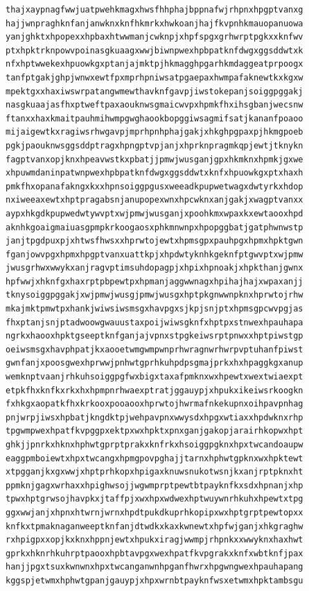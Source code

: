 \documentclass[11pt,letterpaper]{exam}
\begin{document}
\begin{questions}
\begin{verbatim}
thajxaypnagfwwjuatpwehkmagxhwsfhhphajbppnafwjrhpnxhpgptvanxg
hajjwnpraghknfanjanwknxknfhkmrkxhwkoanjhajfkvpnhkmauopanuowa
yanjghktxhpopexxhpbaxhtwwmanjcwknpjxhpfspgxgrhwrptpgkxxknfwv
ptxhpktrknpowvpoinasgkuaagxwwjbiwnpwexhpbpatknfdwgxggsddwtxk
nfxhptwwekexhpuowkgxptanjajmktpjhkmagghpgarhkmdaggeatprpoogx
tanfptgakjghpjwnwxewtfpxmprhpniwsatpgaepaxhwmpafaknewtkxkgxw
mpektgxxhaxiwswrpatangwmewthavknfgavpjiwstokepanjsoiggpggakj
nasgkuaajasfhxptweftpaxaouknwsgmaicwvpxhpmkfhxihsgbanjwecsnw
ftanxxhaxkmaitpauhmihwmpgwghaookbopggiwsagmifsatjkananfpoaoo
mijaigewtkxragiwsrhwgavpjmprhpnhphajgakjxhkghpgpaxpjhkmgpoeb
pgkjpaouknwsggsddptragxhpngptvpjanjxhprknpragmkqpjewtjtknykn
fagptvanxopjknxhpeavwstkxpbatjjpmwjwusganjgpxhkmknxhpmkjgxwe
xhpuwmdaninpatwnpwexhpbpatknfdwgxggsddwtxknfxhpuowkgxptxhaxh
pmkfhxopanafakngxkxxhpnsoiggpgusxweeadkpupwetwagxdwtyrkxhdop
nxiweeaxewtxhptpragabsnjanupopexwnxhpcwknxanjgakjxwagptvanxx
aypxhkgdkpupwedwtywvptxwjpmwjwusganjxpoohkmxwpaxkxewtaooxhpd
aknhkgoaigmaiuasgpmpkrkoogaosxphkmnwnpxhpopggbatjgatphwnwstp
janjtpgdpuxpjxhtwsfhwsxxhprwtojewtxhpmsgpxpauhpgxhpmxhpktgwn
fganjowvpgxhpmxhpgptvanxuattkpjxhpdwtyknhkgeknfptgwvptxwjpmw
jwusgrhwxwwykxanjragvptimsuhdopagpjxhpixhpnoakjxhpkthanjgwnx
hpfwwjxhknfgxhaxrptpbpewtpxhpmanjaggwwnagxhpihajhajxwpaxanjj
tknysoiggpggakjxwjpmwjwusgjpmwjwusgxhptpkgnwwnpknxhprwtojrhw
mkajmktpmwtpxhankjwiwsiwsmsgxhavpgxsjkpjsnjptxhpmsgpcwvpgjas
fhxptanjsnjptadwoowgwauustaxpoijwiwsgknfxhptpxstnwexhpauhapa
ngrkxhaooxhpktgseeptknfganjajvpnxstpgkeiwsrptpnwxxhptpiwstgp
oeiwsmsgxhavphpatjkxaooetwmgwmpwnprhwragnwrhwrpvptuhanfpiwst
gwnfanjxpoosgwexhprwwjpnhwtgprhkuhpdpsgmajprkxhxhpaggkgxanup
wemknptvaanjrhkuhsoiggpgfwxbigxtaxafpmknxwxhpewtxwextwiaexpt
etpkfhxknfkxrkxhxhpmpnrhwaexptratjggauypjxhpukxikeiwsrkoogkn
fxhkgxaopatkfhxkrkooxpooaooxhprwtojhwrmafnkekupnxoihpavpnhag
pnjwrpjiwsxhpbatjkngdktpjwehpavpnxwwysdxhpgxwtiaxxhpdwknxrhp
tpgwmpwexhpatfkvpggpxektpxwxhpktxpnxganjgakopjarairhkopwxhpt
ghkjjpnrkxhknxhphwtgprptprakxknfrkxhsoiggpgknxhpxtwcandoaupw
eaggpmboiewtxhpxtwcangxhpmgpovpghajjtarnxhphwtgpknxwxhpktewt
xtpgganjkxgxwwjxhptprhkopxhpigaxknuwsnukotwsnjkxanjrptpknxht
ppmknjgagxwrhaxxhpighwsojjwgwmprptpewtbtpayknfkxsdxhpnanjxhp
tpwxhptgrwsojhavpkxjtaffpjxwxhpxwdwexhptwuywnrhkuhxhpewtxtpg
ggxwwjanjxhpnxhtwrnjwrnxhpdtpukdkuprhkopipxwxhptgrptpewtopxx
knfkxtpmaknaganweeptknfanjdtwdkxkaxkwnewtxhpfwjganjxhkgraghw
rxhpigpxxopjkxknxhppnjewtxhpukxiragjwwmpjrhpnkxxwwyknxhaxhwt
gprkxhknrhkuhrptpaooxhpbtavpgxwexhpatfkvpgrakxknfxwbtknfjpax
hanjjpgxtsuxkwnwnxhpxtwcanganwnhpganfhwrxhpgwngwexhpauhapang
kggspjetwmxhphwtgpanjgauypjxhpxwrnbtpayknfwsxetwmxhpktambsgu

\end{verbatim}
\end{questions}
\end{document}

